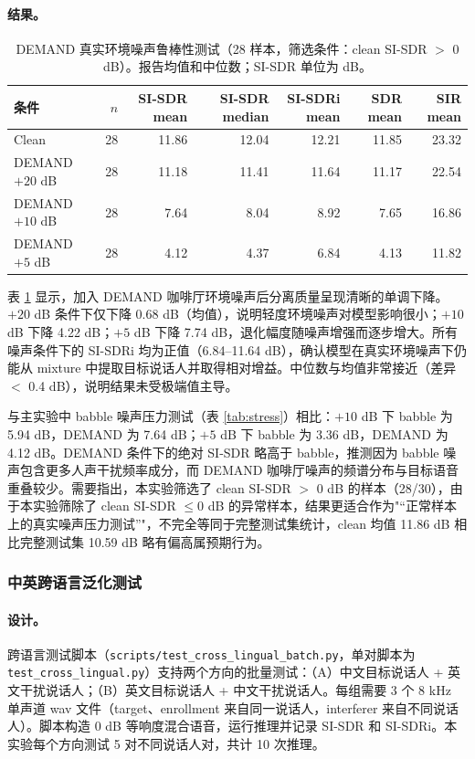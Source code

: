 \documentclass[UTF8,zihao=5,a4paper]{ctexart}
\newcommand{\sisdr}{SI-SDR}
\begin{document}
\paragraph{结果。}

\begin{table}[H]
\centering
\small
\begin{tabular}{lrrrrrr}
\toprule
条件 & $n$ & \sisdr{} mean & \sisdr{} median & \sisdr{}i mean & SDR mean & SIR mean \\
\midrule
Clean & 28 & 11.86 & 12.04 & 12.21 & 11.85 & 23.32 \\
DEMAND $+20$ dB & 28 & 11.18 & 11.41 & 11.64 & 11.17 & 22.54 \\
DEMAND $+10$ dB & 28 & 7.64 & 8.04 & 8.92 & 7.65 & 16.86 \\
DEMAND $+5$ dB & 28 & 4.12 & 4.37 & 6.84 & 4.13 & 11.82 \\
\bottomrule
\end{tabular}
\normalsize
\caption{DEMAND 真实环境噪声鲁棒性测试（28 样本，筛选条件：clean \sisdr{} $>$ 0 dB）。报告均值和中位数；\sisdr{} 单位为 dB。}
\label{tab:noise}
\end{table}

表 \ref{tab:noise} 显示，加入 DEMAND 咖啡厅环境噪声后分离质量呈现清晰的单调下降。$+20$ dB 条件下仅下降 0.68 dB（均值），说明轻度环境噪声对模型影响很小；$+10$ dB 下降 4.22 dB；$+5$ dB 下降 7.74 dB，退化幅度随噪声增强而逐步增大。所有噪声条件下的 \sisdr{}i 均为正值（6.84--11.64 dB），确认模型在真实环境噪声下仍能从 mixture 中提取目标说话人并取得相对增益。中位数与均值非常接近（差异 $<$ 0.4 dB），说明结果未受极端值主导。

与主实验中 babble 噪声压力测试（表 \ref{tab:stress}）相比：$+10$ dB 下 babble 为 5.94 dB，DEMAND 为 7.64 dB；$+5$ dB 下 babble 为 3.36 dB，DEMAND 为 4.12 dB。DEMAND 条件下的绝对 \sisdr{} 略高于 babble，推测因为 babble 噪声包含更多人声干扰频率成分，而 DEMAND 咖啡厅噪声的频谱分布与目标语音重叠较少。需要指出，本实验筛选了 clean \sisdr{} $>$ 0 dB 的样本（28/30），由于本实验筛除了 clean SI-SDR $\le 0$ dB 的异常样本，结果更适合作为"“正常样本上的真实噪声压力测试”"，不完全等同于完整测试集统计，clean 均值 11.86 dB 相比完整测试集 10.59 dB 略有偏高属预期行为。

\subsubsection{中英跨语言泛化测试}

\paragraph{设计。}
跨语言测试脚本（\texttt{scripts/test\_cross\_lingual\_batch.py}，单对脚本为 \texttt{test\_cross\_lingual.py}）支持两个方向的批量测试：（A）中文目标说话人 + 英文干扰说话人；（B）英文目标说话人 + 中文干扰说话人。每组需要 3 个 8 kHz 单声道 wav 文件（target、enrollment 来自同一说话人，interferer 来自不同说话人）。脚本构造 0 dB 等响度混合语音，运行推理并记录 \sisdr{} 和 \sisdr{}i。本实验每个方向测试 5 对不同说话人对，共计 10 次推理。
\end{document}

